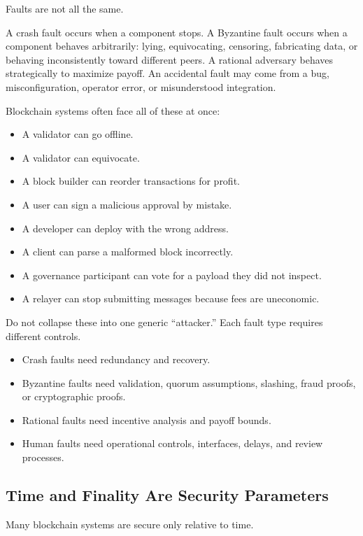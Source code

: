 Faults are not all the same.

A crash fault occurs when a component stops. A Byzantine fault occurs
when a component behaves arbitrarily: lying, equivocating, censoring,
fabricating data, or behaving inconsistently toward different peers. A
rational adversary behaves strategically to maximize payoff. An
accidental fault may come from a bug, misconfiguration, operator error,
or misunderstood integration.

Blockchain systems often face all of these at once:

\begin{itemize}
\tightlist
\item
  A validator can go offline.
\item
  A validator can equivocate.
\item
  A block builder can reorder transactions for profit.
\item
  A user can sign a malicious approval by mistake.
\item
  A developer can deploy with the wrong address.
\item
  A client can parse a malformed block incorrectly.
\item
  A governance participant can vote for a payload they did not inspect.
\item
  A relayer can stop submitting messages because fees are uneconomic.
\end{itemize}

Do not collapse these into one generic ``attacker.'' Each fault type
requires different controls.

\begin{itemize}
\tightlist
\item
  Crash faults need redundancy and recovery.
\item
  Byzantine faults need validation, quorum assumptions, slashing, fraud
  proofs, or cryptographic proofs.
\item
  Rational faults need incentive analysis and payoff bounds.
\item
  Human faults need operational controls, interfaces, delays, and review
  processes.
\end{itemize}

\subsection{Time and Finality Are Security Parameters}

Many blockchain systems are secure only relative to time.

